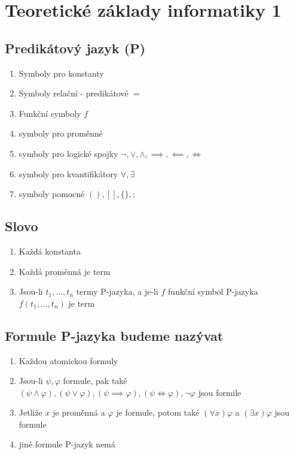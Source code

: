 


  \section*{Teoretické základy informatiky 1}

  \subsection*{Predikátový jazyk (P)}
  \begin{enumerate}
    \item  Symboly pro konstanty
    \item Symboly relační - predikátové $=$
    \item Funkční symboly $f$
    \item symboly pro proměnné
    \item symboly pro logické spojky $\neg, \lor, \land, \implies, \impliedby, \iff$
    \item symboly pro kvantifikátory $\forall, \exists$
    \item symboly pomocné $\left(\right), [] , \{\},;$
  \end{enumerate}
 

  \subsection*{Slovo}
  \begin{enumerate}
    \item Každá konstanta
    \item Každá proměnná je term
    \item Jsou-li $t_1, \dots , t_n$ termy P-jazyka, a je-li $f$ funkční symbol P-jazyka $f(t_1, \dots, t_n)$ je term
  \end{enumerate}

  \subsection*{Formule P-jazyka budeme nazývat}
  \begin{enumerate}
    \item Každou atomickou formuly
    \item Jsou-li $\psi, \varphi$ formule, pak také $(\psi \land \varphi), (\psi \lor \varphi), (\psi \implies \varphi), (\psi \iff \varphi), \neg \varphi$ jsou formile
    \item Jetliže $x$ je proměnná a $\varphi$ je formule, potom také $(\forall x)\varphi$ a $(\exists x)\varphi$ jsou formule
    \item jiné formule P-jazyk nemá
  \end{enumerate}

